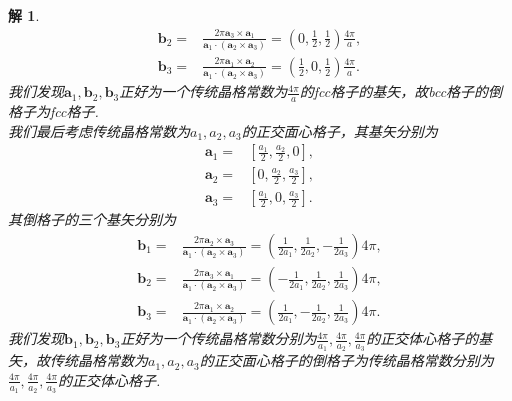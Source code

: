 \documentclass[UTF8,10pt,a4paper]{article}
\theoremstyle{Problem}
\theoremstyle{Solution}
\newtheorem*{sol}{解}
\begin{document}
\begin{sol}
\begin{align*}
        \bm{b}_2=&\frac{2\pi\bm{a}_3\times\bm{a}_1}{\bm{a}_1\cdot(\bm{a}_2\times\bm{a}_3)}=(0,\frac{1}{2},\frac{1}{2})\frac{4\pi}{a},\\
        \bm{b}_3=&\frac{2\pi\bm{a}_1\times\bm{a}_2}{\bm{a}_1\cdot(\bm{a}_2\times\bm{a}_3)}=(\frac{1}{2},0,\frac{1}{2})\frac{4\pi}{a}.
    \end{align*}
    我们发现$\bm{a}_1,\bm{b}_2,\bm{b}_3$正好为一个传统晶格常数为$\frac{4\pi}{a}$的fcc格子的基矢，故bcc格子的倒格子为fcc格子.\\
    我们最后考虑传统晶格常数为$a_1,a_2,a_3$的正交面心格子，其基矢分别为
    \begin{align*}
        \bm{a}_1=&[\frac{a_1}{2},\frac{a_2}{2},0],\\
        \bm{a}_2=&[0,\frac{a_2}{2},\frac{a_3}{2}],\\
        \bm{a}_3=&[\frac{a_1}{2},0,\frac{a_3}{2}].
    \end{align*}
    其倒格子的三个基矢分别为
    \begin{align*}
        \bm{b}_1=&\frac{2\pi\bm{a}_2\times\bm{a}_3}{\bm{a}_1\cdot(\bm{a}_2\times\bm{a}_3)}=(\frac{1}{2a_1},\frac{1}{2a_2},-\frac{1}{2a_3})4\pi,\\
        \bm{b}_2=&\frac{2\pi\bm{a}_3\times\bm{a}_1}{\bm{a}_1\cdot(\bm{a}_2\times\bm{a}_3)}=(-\frac{1}{2a_1},\frac{1}{2a_2},\frac{1}{2a_3})4\pi,\\
        \bm{b}_3=&\frac{2\pi\bm{a}_1\times\bm{a}_2}{\bm{a}_1\cdot(\bm{a}_2\times\bm{a}_3)}=(\frac{1}{2a_1},-\frac{1}{2a_2},\frac{1}{2a_3})4\pi.
    \end{align*}
    我们发现$\bm{b}_1,\bm{b}_2,\bm{b}_3$正好为一个传统晶格常数分别为$\frac{4\pi}{a_1},\frac{4\pi}{a_2},\frac{4\pi}{a_3}$的正交体心格子的基矢，故传统晶格常数为$a_1,a_2,a_3$的正交面心格子的倒格子为传统晶格常数分别为$\frac{4\pi}{a_1},\frac{4\pi}{a_2},\frac{4\pi}{a_3}$的正交体心格子.
\end{sol}
\end{document}
